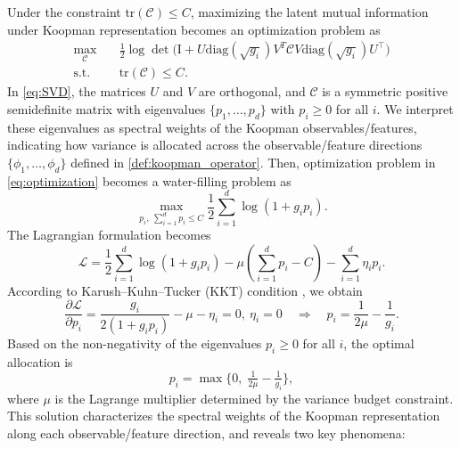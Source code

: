 \documentclass{article} %
\begin{document}
\begin{proofwithframe}
Under the constraint $\mathrm{tr}(\mathcal{C}) \leq C$, maximizing the latent mutual information under Koopman representation becomes an optimization problem as 
\begin{equation} \label{eq:optimization}
\begin{split}
    \max_{\mathcal{C}} \quad & \frac{1}{2} \log  \det \big(\mathrm{I} + U \text{diag}(\sqrt{g_i}) V^T \mathcal{C} V \text{diag}(\sqrt{g_i}) U^{\top}   \big) \\ 
    \text{s.t.} \ \ & \mathrm{tr}(\mathcal{C}) \leq C. 
\end{split}
\end{equation}
In \eqref{eq:SVD}, the matrices $U$ and $V$ are orthogonal, and $\mathcal{C}$ is a symmetric positive semidefinite matrix with eigenvalues $\{p_1,\dots,p_d\}$ with $p_i \geq 0$ for all $i$. We interpret these eigenvalues as spectral weights of the Koopman observables/features, indicating how variance is allocated across the observable/feature directions $\{\phi_1,\dots,\phi_d\}$ defined in \eqref{def:koopman_operator}. Then, optimization problem in \eqref{eq:optimization} becomes a water-filling problem as
\begin{equation}
    \max_{p_i, \ \sum_{i = 1}^d p_i \leq C}   \frac{1}{2} \sum_{i=1}^d \log (1+ g_i p_i). 
\end{equation}
The Lagrangian formulation becomes 
\begin{equation} \label{eq:first_lagrangian}
    \mathcal{L} = \frac{1}{2} \sum_{i=1}^d \log (1+ g_i p_i) - \mu (\sum_{i = 1}^d p_i - C  ) - \sum_{i = 1}^d \eta_i p_i. 
\end{equation}
According to Karush–Kuhn–Tucker (KKT) condition \citep{boyd2004convex}, we obtain
\begin{equation}
    \frac{\partial \mathcal{L} }{\partial p_i } = \frac{g_i}{ 2(1+g_ip_i)} - \mu - \eta_i = 0, \ \eta_i = 0 \quad \Rightarrow  \quad p_{i} = \frac{1}{2\mu} - \frac{1}{g_i}.
\end{equation}
Based on the non-negativity of the eigenvalues $p_i \geq 0$ for all $i$, the optimal allocation is
\begin{equation} \label{eq:KKT_solution_1}
p_i = \max \Big\{ 0,\; \tfrac{1}{2\mu} - \tfrac{1}{g_i} \Big\},
\end{equation}
where $\mu$ is the Lagrange multiplier determined by the variance budget constraint.
This solution characterizes the spectral weights of the Koopman representation along each observable/feature direction, and reveals two key phenomena:
\begin{itemize} 

\end{itemize}
\end{proofwithframe}
\end{document}
